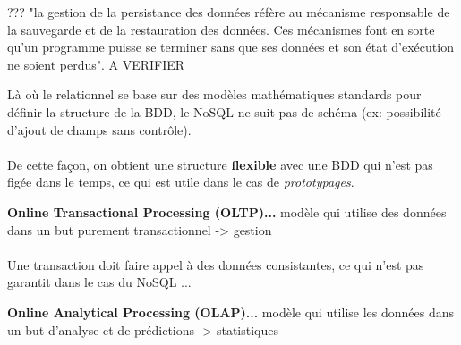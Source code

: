 \item{}
{???}
{"la gestion de la persistance des données réfère au mécanisme responsable de la sauvegarde et de la restauration des données. Ces mécanismes font en sorte qu'un programme puisse se terminer sans que ses données et son état d'exécution ne soient perdus". A VERIFIER}


\item{}
{\faux}
{Là où le relationnel se base sur des modèles mathématiques standards pour définir la structure de la BDD, le NoSQL ne suit pas de schéma (ex: possibilité d'ajout de champs sans contrôle). 
\paragraph{}
De cette façon, on obtient une structure \textbf{flexible} avec une BDD qui n'est pas figée dans le temps, ce qui est utile dans le cas de \textit{prototypages}.
}


\item{}
{\faux}
{\textbf{Online Transactional Processing (OLTP)...} modèle qui utilise des données dans un but purement transactionnel -> gestion

\paragraph{}
Une transaction doit faire appel à des données consistantes, ce qui n'est pas garantit dans le cas du NoSQL ...
}


\item{}
{\vrai}
{\textbf{Online Analytical Processing (OLAP)...} modèle qui utilise les données dans un but d'analyse et de prédictions -> statistiques
}


